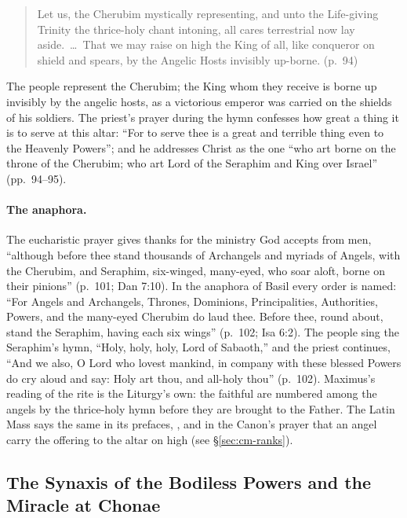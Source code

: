 \begin{quote}
Let us, the Cherubim mystically representing, and unto the Life-giving
Trinity the thrice-holy chant intoning, all cares terrestrial now lay
aside.~\dots\ That we may raise on high the King of all, like conqueror on
shield and spears, by the Angelic Hosts invisibly up-borne. (p.~94)
\end{quote}

\noindent The people represent the Cherubim; the King whom they receive is
borne up invisibly by the angelic hosts, as a victorious emperor was
carried on the shields of his soldiers. The priest's prayer during the hymn
confesses how great a thing it is to serve at this altar: ``For to serve
thee is a great and terrible thing even to the Heavenly Powers''; and he
addresses Christ as the one ``who art borne on the throne of the Cherubim;
who art Lord of the Seraphim and King over Israel'' (pp.~94--95).

\paragraph{The anaphora.} The eucharistic prayer gives thanks for the
ministry God accepts from men, ``although before thee stand thousands of
Archangels and myriads of Angels, with the Cherubim, and Seraphim,
six-winged, many-eyed, who soar aloft, borne on their pinions'' (p.~101;
Dan 7:10). In the anaphora of Basil every order is named: ``For Angels and
Archangels, Thrones, Dominions, Principalities, Authorities, Powers, and the
many-eyed Cherubim do laud thee. Before thee, round about, stand the
Seraphim, having each six wings'' (p.~102; Isa 6:2). The people sing the
Seraphim's hymn, ``Holy, holy, holy, Lord of Sabaoth,'' and the priest
continues, ``And we also, O Lord who lovest mankind, in company with these
blessed Powers do cry aloud and say: Holy art thou, and all-holy thou'' (p.~102).
Maximus's reading of the rite is the Liturgy's own: the faithful are
numbered among the angels by the thrice-holy hymn before they are brought to
the Father. The Latin Mass says the same in its prefaces, , and in the Canon's prayer
that an angel carry the offering to the altar on high (see
\S\ref{sec:cm-ranks}).

\sectionguard
\subsection{The Synaxis of the Bodiless Powers and the Miracle at Chonae}\label{sec:bz-feasts}

